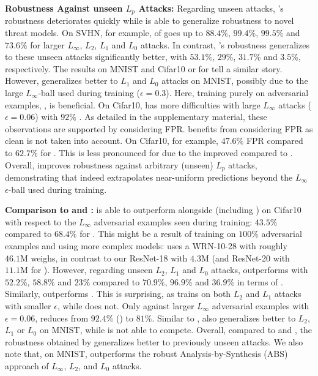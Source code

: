 \textbf{Robustness Against \textcolor{colorbrewer1}{unseen} $L_p$ Attacks:}
%
Regarding \textcolor{colorbrewer1}{unseen} attacks, \AdvTrain's robustness deteriorates quickly while \ConfTrain is able to generalize robustness to novel threat models. On SVHN, for example, \RTE of \AdvTrainHalf goes up to $88.4\%$, $99.4\%$, $99.5\%$ and $73.6\%$ for larger $L_\infty$, $L_2$, $L_1$ and $L_0$ attacks. In contrast, \ConfTrain's robustness generalizes to these unseen attacks significantly better, with $53.1\%$, $29\%$, $31.7\%$ and $3.5\%$, respectively. The results on MNIST and Cifar10 or for \AdvTrainFull tell a similar story. However, \AdvTrain generalizes better to $L_1$ and $L_0$ attacks on MNIST, possibly due to the large $L_\infty$-ball used during training ($\epsilon = 0.3$). Here, training purely on adversarial examples, \ie, \AdvTrainFull is beneficial. On Cifar10, \ConfTrain has more difficulties with large $L_\infty$ attacks ($\epsilon = 0.06$) with $92\%$ \RTE.
As detailed in the supplementary material, these observations are supported by considering FPR. \AdvTrain benefits from considering FPR as clean \TE is not taken into account. On Cifar10, for example, $47.6\%$ FPR compared to $62.7\%$ \RTE for \AdvTrainHalf. This is less pronounced for \ConfTrain due to the improved \TE compared to \AdvTrain. Overall, \ConfTrain improves robustness against arbitrary (unseen) $L_p$ attacks, demonstrating that \ConfTrain indeed extrapolates near-uniform predictions beyond the $L_\infty$ $\epsilon$-ball used during training.

 
\textbf{Comparison to \Wong and \TRADES:}
%
\TRADES is able to outperform \ConfTrain alongside \AdvTrain (including \MadryAT) on Cifar10 with respect to the $L_\infty$ adversarial examples \textcolor{colorbrewer3}{seen} during training: $43.5\%$ \RTE compared to $68.4\%$ for \ConfTrain. This might be a result of training on $100\%$ adversarial examples and using more complex models: \TRADES uses a WRN-10-28 with roughly $46.1\text{M}$ weighs, in contrast to our ResNet-18 with $4.3\text{M}$ (and ResNet-20 with $11.1\text{M}$ for \Wong). However, regarding \textcolor{colorbrewer1}{unseen} $L_2$, $L_1$ and $L_0$ attacks, \ConfTrain outperforms \TRADES with $52.2\%$, $58.8\%$ and $23\%$ compared to $70.9\%$, $96.9\%$ and $36.9\%$ in terms of \RTE. Similarly, \ConfTrain outperforms \Wong. This is surprising, as \Wong trains on both $L_2$ and $L_1$ attacks with smaller $\epsilon$, while \ConfTrain does not. Only against larger $L_\infty$ adversarial examples with $\epsilon = 0.06$, \TRADES reduces \RTE from $92.4\%$ (\ConfTrain) to $81\%$. Similar to \AdvTrain, \TRADES also generalizes better to $L_2$, $L_1$ or $L_0$ on MNIST, while \Wong is not able to compete. Overall, compared to \Wong and \TRADES, the robustness obtained by \ConfTrain generalizes better to previously unseen attacks. We also note that, on MNIST, \ConfTrain outperforms the robust Analysis-by-Synthesis (ABS) approach of \cite{SchottICLR2019} \wrt $L_\infty$, $L_2$, and $L_0$ attacks.

